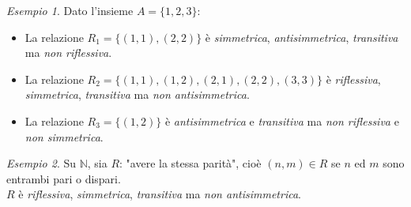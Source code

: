 \documentclass[a4paper, 12pt]{report}
\theoremstyle{definition}
\theoremstyle{remark}
\newtheorem{example}{Esempio}[definition]
\theoremstyle{plain}
\newcommand{\N}{\mathbb{N}}
\begin{document}
\begin{example}
    Dato l'insieme $A = \{1, 2, 3\}$:
    \begin{itemize}
        \item La relazione $R_1 = \{(1, 1), (2, 2)\}$ è \textit{simmetrica}, \textit{antisimmetrica}, \textit{transitiva} ma \textit{non riflessiva}.
        \item La relazione $R_2 = \{(1,1), (1,2), (2, 1), (2, 2), (3, 3)\}$ è \textit{riflessiva}, \textit{simmetrica}, \textit{transitiva} ma \textit{non antisimmetrica}.
        \item La relazione $R_3 = \{(1, 2)\}$ è \textit{antisimmetrica} e \textit{transitiva} ma \textit{non riflessiva} e \textit{non simmetrica}.
    \end{itemize}
\end{example}

\begin{example}
    Su $\N$, sia $R$: "avere la stessa parità", cioè $(n,m) \in R$ se $n$ ed $m$ sono entrambi pari o dispari.\\
    $R$ è {\it riflessiva}, {\it simmetrica}, {\it transitiva} ma {\it non antisimmetrica}.
\end{example}
\end{document}
